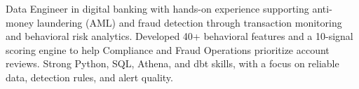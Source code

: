 
\begin{cvparagraph}
Data Engineer in digital banking with hands-on experience supporting anti-money laundering (AML) and fraud detection through transaction monitoring and behavioral risk analytics. Developed 40+ behavioral features and a 10-signal scoring engine to help Compliance and Fraud Operations prioritize account reviews. Strong Python, SQL, Athena, and dbt skills, with a focus on reliable data, detection rules, and alert quality.
\end{cvparagraph}
